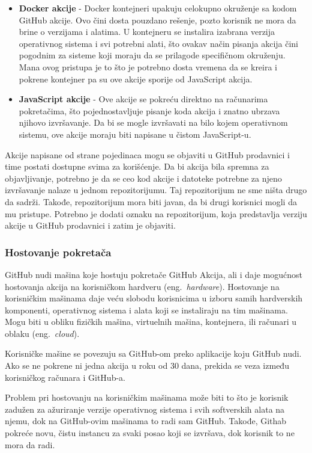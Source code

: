 \documentclass[12pt]{report}
\begin{document}
\begin{itemize}
    \item\textbf{Docker akcije} - Docker kontejneri upakuju celokupno okruženje sa kodom GitHub akcije. Ovo čini dosta pouzdano rešenje, pozto korisnik ne mora da brine o verzijama i alatima. U kontejneru se instalira izabrana verzija operativnog sistema i svi potrebni alati, što ovakav način pisanja akcija čini pogodnim za sisteme koji moraju da se prilagode specifičnom okruženju. Mana ovog pristupa je to što je potrebno dosta vremena da se kreira i pokrene kontejner pa su ove akcije sporije od JavaScript akcija.
    \item\textbf{JavaScript akcije} - Ove akcije se pokreću direktno na računarima pokretačima, što pojednostavljuje pisanje koda akcija i znatno ubrzava njihovo izvršavanje. Da bi se mogle izvršavati na bilo kojem operativnom sistemu, ove akcije moraju biti napisane u čistom JavaScript-u.
\end{itemize}

Akcije napisane od strane pojedinaca mogu se objaviti u GitHub prodavnici i time postati dostupne svima za korišćenje. Da bi akcija bila spremna za objavljivanje, potrebno je da se ceo kod akcije i datoteke potrebne za njeno izvršavanje nalaze u jednom repozitorijumu. Taj repozitorijum ne sme ništa drugo da sadrži. Takođe, repozitorijum mora biti javan, da bi drugi korisnici mogli da mu pristupe. Potrebno je dodati oznaku na repozitorijum, koja predstavlja verziju akcije u GitHub prodavnici i zatim je objaviti.

\subsubsection{Hostovanje pokretača}
GitHub nudi mašina koje hostuju pokretače GitHub Akcija, ali i daje mogućnost hostovanja akcija na korisničkom hardveru (eng.\ \textit{hardware}). Hostovanje na korisničkim mašinama daje veću slobodu korisnicima u izboru samih hardverskih komponenti, operativnog sistema i alata koji se instaliraju na tim mašinama. Mogu biti u obliku fizičkih mašina, virtuelnih mašina, kontejnera, ili računari u oblaku (eng.\ \textit{cloud}).

Korisničke mašine se povezuju sa GitHub-om preko aplikacije koju GitHub nudi. Ako se ne pokrene ni jedna akcija u roku od 30 dana, prekida se veza između korisničkog računara i GitHub-a.

Problem pri hostovanju na korisničkim mašinama može biti to što je korisnik zadužen za ažuriranje verzije operativnog sistema i svih softverskih alata na njemu, dok na GitHub-ovim mašinama to radi sam GitHub. Takođe, Githab pokreće novu, čistu instancu za svaki posao koji se izvršava, dok korisnik to ne mora da radi.
\end{document}
